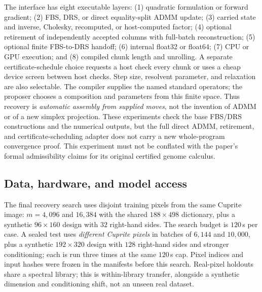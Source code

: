 The interface has eight executable layers: (1) quadratic formulation or
forward gradient; (2) FBS, DRS, or direct equality-split ADMM update;
(3) carried state and inverse, Cholesky, recomputed, or host-computed factor;
(4) optional retirement of independently accepted columns with full-batch
reconstruction; (5) optional finite FBS-to-DRS handoff; (6) internal float32 or
float64; (7) CPU or GPU execution; and (8) compiled chunk length and unrolling.
A separate certificate-schedule choice requests a host check every chunk or
uses a cheap device screen between host checks. Step size, resolvent parameter,
and relaxation are also selectable. The compiler supplies the named standard
operators; the proposer chooses a composition and parameters from this finite
space. Thus recovery is \emph{automatic assembly from supplied moves}, not the
invention of ADMM or of a new simplex projection. These experiments check the
base FBS/DRS constructions and the numerical outputs, but the full direct ADMM,
retirement, and certificate-scheduling adapter does not carry a new
whole-program convergence proof. This experiment must not be conflated with the
paper's formal admissibility claims for its original certified genome calculus.

\subsection{Data, hardware, and model access}
The final recovery search uses disjoint training pixels from the same Cuprite
image: $m=4{,}096$ and $16{,}384$ with the shared $188\times498$ dictionary,
plus a synthetic $96\times160$ design with $32$ right-hand sides. The search
budget is $120$\,s per case. A sealed test uses \emph{different Cuprite pixels}
in batches of $6{,}144$ and $10{,}000$, plus a synthetic $192\times320$
design with $128$ right-hand sides and stronger conditioning; each is run three
times at the same $120$\,s cap. Pixel indices and input hashes were frozen in
the manifests before this search. Real-pixel holdouts share a spectral library;
this is within-library transfer, alongside a synthetic dimension and
conditioning shift, not an unseen real dataset.

